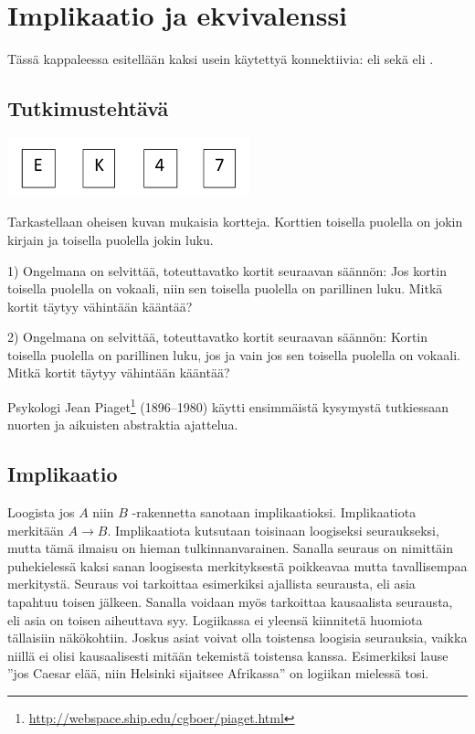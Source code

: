 

\section{Implikaatio ja ekvivalenssi}
Tässä kappaleessa esitellään kaksi usein käytettyä konnektiivia:  eli  sekä  eli .

\subsection*{Tutkimustehtävä}

\begin{center}
\includegraphics[width=7cm]{pictures/piaget}
\end{center}

Tarkastellaan oheisen kuvan mukaisia kortteja. Korttien toisella puolella on jokin kirjain ja toisella puolella jokin luku.

1) Ongelmana on selvittää, toteuttavatko kortit seuraavan säännön: Jos kortin toisella puolella on vokaali, niin sen toisella puolella on parillinen luku. Mitkä kortit täytyy vähintään kääntää?

2) Ongelmana on selvittää, toteuttavatko kortit seuraavan säännön: Kortin toisella puolella on parillinen luku, jos ja vain jos sen toisella puolella on vokaali. Mitkä kortit täytyy vähintään kääntää?

Psykologi Jean Piaget\footnote{\url{http://webspace.ship.edu/cgboer/piaget.html}} (1896--1980) käytti ensimmäistä kysymystä tutkiessaan nuorten ja aikuisten abstraktia ajattelua.

\subsection*{Implikaatio}

Loogista jos $A$ niin $B$ -rakennetta sanotaan implikaatioksi. Implikaatiota merkitään $A\to B$. Implikaatiota  kutsutaan toisinaan loogiseksi seu\-rauk\-sek\-si, mutta tämä ilmaisu on hieman tulkinnanvarainen. Sanalla seuraus on nimittäin puhekielessä kaksi sanan loogisesta merkityksestä poikkeavaa mutta tavallisempaa merkitystä. Seuraus voi tarkoittaa esimerkiksi ajallista seurausta, eli asia tapahtuu toisen jälkeen. Sanalla voidaan myös tarkoittaa kausaalista seurausta, eli asia on toisen aiheuttava syy. Logiikassa ei yleensä kiinnitetä huomiota tällaisiin näkökohtiin. Joskus asiat voivat olla toistensa loogisia seurauksia, vaikka niillä ei olisi kausaalisesti mitään tekemistä toistensa kanssa. Esimerkiksi lause ''jos Caesar elää, niin Helsinki sijaitsee Afrikassa'' on logiikan mielessä tosi. 

